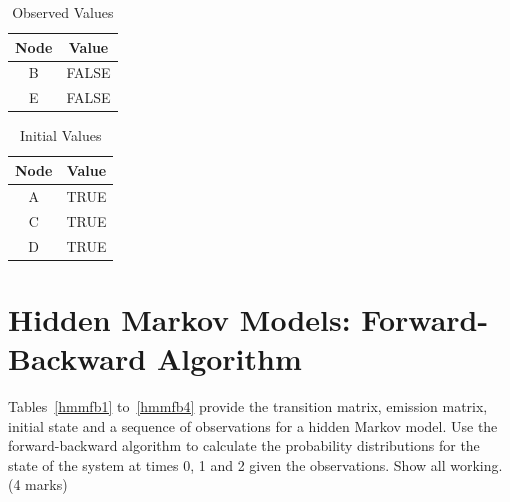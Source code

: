 \documentclass{article}
\begin{document}
\begin{table}[h!]
\caption{Observed Values}
\label{MCMC6}
\begin{center}
\begin{tabular}{ |c|c| } 
\hline
 Node & Value \\
\hline
B & FALSE\\
E & FALSE\\
\hline
\end{tabular}
\end{center}
\end{table}
\begin{table}[h!]
\caption{Initial Values}
\label{MCMC7}
\begin{center}
\begin{tabular}{ |c|c| } 
\hline
 Node  & Value \\
\hline
A & TRUE\\
C & TRUE\\
D & TRUE\\
\hline
\end{tabular}
\end{center}
\end{table}
\clearpage
\section{Hidden Markov Models: Forward-Backward Algorithm}

Tables~\ref{hmmfb1} to~\ref{hmmfb4} provide the transition matrix, emission matrix, initial state and a sequence of observations for a hidden Markov model. Use the forward-backward algorithm to calculate the probability distributions for the state of the system at times 0, 1 and 2 given the observations. Show all working. (4 marks)
\end{document}
